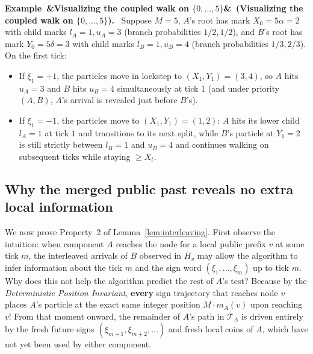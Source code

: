 \documentclass[11pt,letterpaper]{article}
\newenvironment{example}[1][]{\refstepcounter{lemma}\par\medskip\noindent\textbf{Example~\thelemma\ifx&#1&\else\ (#1)\fi.}\ \ignorespaces}{\par\medskip}
\begin{document}
\begin{example}[Visualizing the coupled walk on $\{0,\ldots,5\}$]\label{ex:walk}
Suppose $M=5$, $A$'s root has mark $X_0 = 5\alpha = 2$ with child marks $l_A=1, u_A=3$ (branch probabilities $1/2, 1/2$), and $B$'s root has mark $Y_0 = 5\delta = 3$ with child marks $l_B=1, u_B=4$ (branch probabilities $1/3, 2/3$). On the first tick:
\begin{itemize}
\item If $\xi_1 = +1$, the particles move in lockstep to $(X_1,Y_1)=(3,4)$, so $A$ hits $u_A=3$ and $B$ hits $u_B=4$ simultaneously at tick $1$ (and under priority $(A,B)$, $A$'s arrival is revealed just before $B$'s).
\item If $\xi_1 = -1$, the particles move to $(X_1,Y_1)=(1,2)$: $A$ hits its lower child $l_A=1$ at tick $1$ and transitions to its next split, while $B$'s particle at $Y_1=2$ is still strictly between $l_B=1$ and $u_B=4$ and continues walking on subsequent ticks while staying $\ge X_t$.
\end{itemize}
\end{example}

\subsection{Why the merged public past reveals no extra local information}

We now prove Property~2 of Lemma~\ref{lem:interleaving}. First observe the intuition: when component $A$ reaches the node for a local public prefix $v$ at some tick $m$, the interleaved arrivals of $B$ observed in $H_v$ may allow the algorithm to infer information about the tick $m$ and the sign word $(\xi_1,\ldots,\xi_m)$ up to tick $m$. Why does this not help the algorithm predict the rest of $A$'s test? Because by the \emph{Deterministic Position Invariant}, \textbf{every} sign trajectory that reaches node $v$ places $A$'s particle at the exact same integer position $M\cdot m_A(v)$ upon reaching $v$! From that moment onward, the remainder of $A$'s path in $\mathcal T_A$ is driven entirely by the fresh future signs $(\xi_{m+1},\xi_{m+2},\ldots)$ and fresh local coins of $A$, which have not yet been used by either component.
\end{document}
